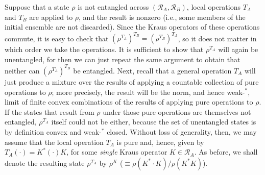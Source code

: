 \documentclass[12pt]{article}
\newcommand{\alg}[1]{\mbox{$\mathcal{#1}$}}
\begin{document}
Suppose that a state  
$\rho$ is not entangled across $(\alg{R}_{A},\alg{R}_{B})$, local 
operations $T_{A}$ and $T_{B}$ are applied to $\rho$, and the result is 
nonzero (i.e., some members of the initial ensemble are not discarded).  
Since the Kraus 
operators of these operations commute, it is easy to check that 
$(\rho^{T_{A}})^{T_{B}}=(\rho^{T_{B}})^{T_{A}}$, so it does not 
matter in 
which order we take the operations.  It is sufficient to show 
that $\rho^{T_{A}}$ will again be unentangled, for then we can just 
repeat the same argument to obtain that neither can $(\rho^{T_{A}})^{T_{B}}$ 
be entangled.  Next, recall that a general operation $T_{A}$ will just produce a 
mixture over the results of applying a countable collection of pure operations 
to $\rho$; more precisely, the result will be the norm, and hence weak-$^{*}$, limit of 
finite convex combinations of the results of applying pure operations 
to $\rho$.  
If the states that result from $\rho$ under those pure operations 
are themselves not 
entangled, $\rho^{T_{A}}$ itself could not be either, because the set of 
unentangled states is by definition convex and weak-$^{*}$ closed.  Without loss of 
generality, then, we may assume that the local operation $T_{A}$ is pure and, hence, given by 
$T_{A}(\cdot)=K^{*}(\cdot)K$, for some
\emph{single} Kraus operator 
$K\in\alg{R}_{A}$.  As before, we shall denote the resulting 
state $\rho^{T_{A}}$ by $\rho^{K}$ ($\equiv \rho(K^{*}\cdot 
K)/\rho(K^{*}K)$).  
\end{document}
